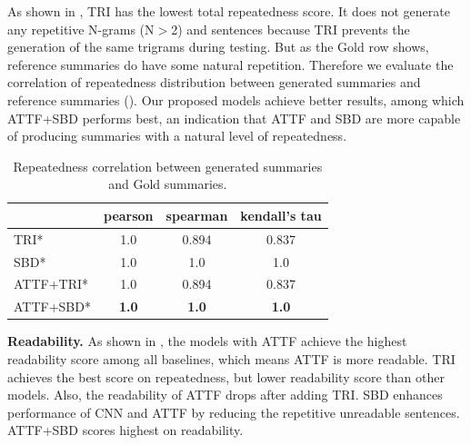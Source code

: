 As shown in , TRI has the lowest total repeatedness score.
It does not generate any repetitive N-grams (N$>$2) and sentences 
because TRI prevents the generation of the same trigrams during testing.
But as the Gold row shows, reference summaries do have some natural repetition.
Therefore we evaluate the correlation of repeatedness distribution between
generated summaries and reference summaries ().
Our proposed models achieve better results, among which ATTF+SBD performs best, an indication that ATTF and SBD are more capable of producing summaries with a natural level of repeatedness.
\begin{table}[th]
	\centering
	\scriptsize
	\begin{tabular}{|l|c|c|c|}
		\hline
		     & pearson  & spearman & kendall's tau \\
		\hline
		TRI* & 1.0 & 0.894 & 0.837  \\
		SBD* & 1.0 & 1.0 & 1.0 \\
		ATTF+TRI* & 1.0 & 0.894 & 0.837 \\
		ATTF+SBD* & \bf 1.0 & \bf 1.0 & \bf 1.0 \\
		\hline
	\end{tabular}
    \caption{Repeatedness correlation between generated summaries and Gold summaries.}
	\label{tab:eval_repcor}
\end{table}
	

\textbf{Readability.}
As shown in , 
the models with ATTF achieve the
highest readability score among all baselines, 
which means ATTF is more readable.
TRI achieves the best score on repeatedness, 
but lower readability score than other models.
Also, the readability of ATTF drops after adding TRI.
SBD enhances performance of CNN and ATTF by reducing the repetitive unreadable sentences. 
ATTF+SBD scores highest on readability.

